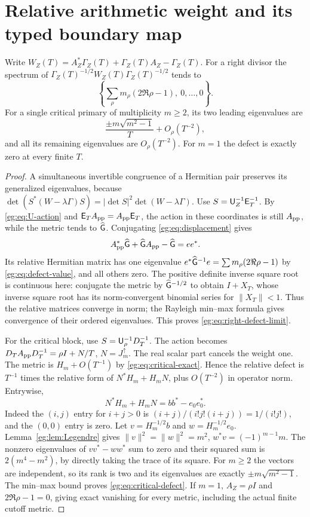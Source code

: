 \documentclass[11pt]{article}
\begin{document}
\section{Relative arithmetic weight and its typed boundary map}\label{eg:sec:action}
\begin{egtheorem}\label{eg:thm:relative}
Write $W_Z(T)=A_Z^*\Gamma_Z(T)+\Gamma_Z(T)A_Z-\Gamma_Z(T)$.
For a right divisor the spectrum of
$\Gamma_Z(T)^{-1/2}W_Z(T)\Gamma_Z(T)^{-1/2}$ tends to
\[
 \left\{\sum_\rho m_\rho(2\Re\rho-1),\ 0,\ldots,0\right\}.
 \tag{EG49}\label{eg:eq:right-defect-limit}
\]
For a single critical primary of multiplicity $m\ge2$, its two
leading eigenvalues are
\[
 \frac{\pm m\sqrt{m^2-1}}T+O_\rho(T^{-2}),
 \tag{EG50}\label{eg:eq:critical-defect}
\]
and all its remaining eigenvalues are $O_\rho(T^{-2})$. For $m=1$
the defect is exactly zero at every finite $T$.
\end{egtheorem}
\begin{proof}
A simultaneous invertible congruence of a Hermitian pair preserves
its generalized eigenvalues, because
$\det(S^*(W-\lambda\Gamma)S)=|\det S|^2\det(W-\lambda\Gamma)$.
Use $S=\mathsf U_Z^{-1}\mathsf E_T^{-1}$. By \eqref{eg:eq:U-action} and
$\mathsf E_TA_{\rm pp}=A_{\rm pp}\mathsf E_T$, the action in these coordinates
is still $A_{\rm pp}$, while the metric tends to $\widehat{\mathsf G}$.
Conjugating \eqref{eg:eq:displacement} gives
\[
 A_{\rm pp}^*\widehat{\mathsf G}+\widehat{\mathsf G} A_{\rm pp}-\widehat{\mathsf G}=ee^*.
\]
Its relative Hermitian matrix has one eigenvalue
$e^*\widehat{\mathsf G}^{-1}e=\sum m_\rho(2\Re\rho-1)$ by
\eqref{eg:eq:defect-value}, and all others zero.
The positive definite inverse square root is continuous here:
conjugate the metric by $\widehat{\mathsf G}^{-1/2}$ to obtain $I+X_T$,
whose inverse square root has its norm-convergent binomial series
for $\|X_T\|<1$. Thus the relative matrices converge in norm;
the Rayleigh min--max formula gives convergence of their ordered
eigenvalues. This proves \eqref{eg:eq:right-defect-limit}.

For the critical block, use $S=\mathsf U_\rho^{-1}D_T^{-1}$.
The action becomes
$D_TA_{\rm pp}D_T^{-1}=\rho I+N/T$, $N=J_m^\uparrow$.
The real scalar part cancels the weight one. The metric is
$H_m+O(T^{-1})$ by \eqref{eg:eq:critical-exact}. Hence the relative
defect is $T^{-1}$ times the relative form of
$N^*H_m+H_mN$, plus $O(T^{-2})$ in operator norm. Entrywise,
\[
 N^*H_m+H_mN=bb^*-e_0e_0^*.
\]
Indeed the $(i,j)$ entry for $i+j>0$ is
$(i+j)/(i!j!(i+j))=1/(i!j!)$, and the $(0,0)$ entry is zero.
Let $v=H_m^{-1/2}b$ and $w=H_m^{-1/2}e_0$.
Lemma~\ref{eg:lem:Legendre} gives
$\|v\|^2=\|w\|^2=m^2$, $w^*v=(-1)^{m-1}m$.
The nonzero eigenvalues of $vv^*-ww^*$ sum to zero and their
squared sum is $2(m^4-m^2)$, by directly taking the trace of
its square. For $m\ge2$ the vectors are independent, so its rank
is two and its eigenvalues are exactly $\pm m\sqrt{m^2-1}$.
The min--max bound proves \eqref{eg:eq:critical-defect}. If $m=1$,
$A_Z=\rho I$ and $2\Re\rho-1=0$, giving exact vanishing for
every metric, including the actual finite cutoff metric.
\end{proof}
\end{document}
